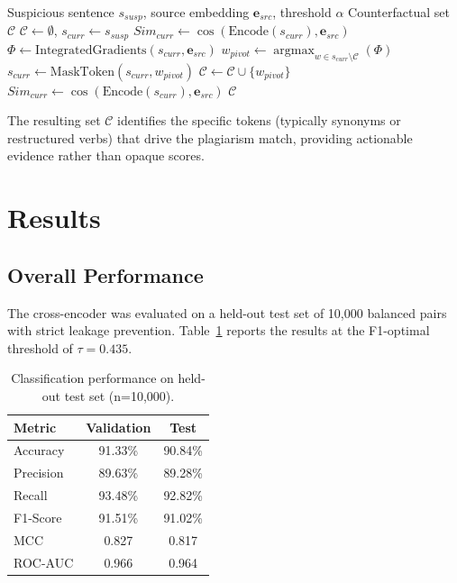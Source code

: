 \documentclass[pdflatex,sn-basic]{sn-jnl}
\begin{document}
\begin{algorithm}[H]
\caption{Gradient-Weighted Iterative Erasure (GWIE)}\label{alg:gwie}
\begin{algorithmic}[1]
\Require Suspicious sentence $s_{susp}$, source embedding $\mathbf{e}_{src}$, threshold $\alpha$
\Ensure Counterfactual set $\mathcal{C}$
\State $\mathcal{C} \leftarrow \emptyset$, $s_{curr} \leftarrow s_{susp}$
\State $Sim_{curr} \leftarrow \cos(\text{Encode}(s_{curr}), \mathbf{e}_{src})$
    \State $\Phi \leftarrow \text{IntegratedGradients}(s_{curr}, \mathbf{e}_{src})$
    \State $w_{pivot} \leftarrow \operatorname{argmax}_{w \in s_{curr} \setminus \mathcal{C}} (\Phi)$
    \State $s_{curr} \leftarrow \text{MaskToken}(s_{curr}, w_{pivot})$
    \State $\mathcal{C} \leftarrow \mathcal{C} \cup \{w_{pivot}\}$
    \State $Sim_{curr} \leftarrow \cos(\text{Encode}(s_{curr}), \mathbf{e}_{src})$
\EndWhile
\State \Return $\mathcal{C}$
\end{algorithmic}
\end{algorithm}

The resulting set $\mathcal{C}$ identifies the specific tokens (typically synonyms or restructured verbs) that drive the plagiarism match, providing actionable evidence rather than opaque scores.

\section{Results}

\subsection{Overall Performance}

The cross-encoder was evaluated on a held-out test set of 10,000 balanced pairs with strict leakage prevention. Table~\ref{tab:results} reports the results at the F1-optimal threshold of $\tau = 0.435$.

\begin{table}[h]
\centering
\caption{Classification performance on held-out test set (n=10,000).}
\label{tab:results}
\begin{tabular}{lcc}
\toprule
\textbf{Metric} & \textbf{Validation} & \textbf{Test} \\
\midrule
Accuracy & 91.33\% & 90.84\% \\
Precision & 89.63\% & 89.28\% \\
Recall & 93.48\% & 92.82\% \\
F1-Score & 91.51\% & 91.02\% \\
MCC & 0.827 & 0.817 \\
ROC-AUC & 0.966 & 0.964 \\
\bottomrule
\end{tabular}
\end{table}
\end{document}
